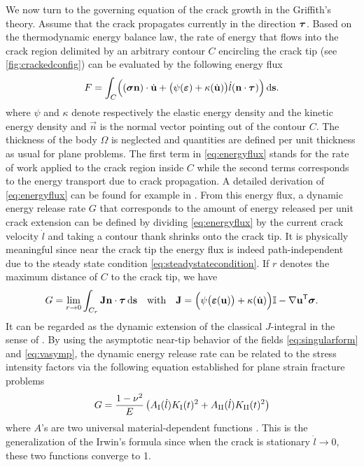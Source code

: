 We now turn to the governing equation of the crack growth in the Griffith's theory. Assume that the crack propagates currently in the direction $\vtau$. Based on the thermodynamic energy balance law, the rate of energy that flows into the crack region delimited by an arbitrary contour $C$ encircling the crack tip (see \cref{fig:crackedconfig}) can be evaluated by the following energy flux
\begin{equation} \label{eq:energyflux}
F=\int_C\Bigl((\sig\vec{n})\cdot\dot{\vec{u}}+\bigl(\psi(\eps)+\kappa(\dot{\vec{u}})\bigr)\dot{l}(\vec{n}\cdot\vtau)\Bigr)\ds.
\end{equation}
where $\psi$ and $\kappa$ denote respectively the elastic energy density and the kinetic energy density and $\vec{n}$ is the normal vector pointing out of the contour $C$. The thickness of the body $\Omega$ is neglected and quantities are defined per unit thickness as usual for plane problems. The first term in \eqref{eq:energyflux} stands for the rate of work applied to the crack region inside $C$ while the second terms corresponds to the energy transport due to crack propagation. A detailed derivation of \eqref{eq:energyflux} can be found for example in \cite{Freund:1972,NakamuraShihFreund:1985}. From this energy flux, a dynamic energy release rate $G$ that corresponds to the amount of energy released per unit crack extension can be defined by dividing \eqref{eq:energyflux} by the current crack velocity $\dot{l}$ and taking a contour thank shrinks onto the crack tip. It is physically meaningful since near the crack tip the energy flux is indeed path-independent due to the steady state condition \eqref{eq:steadystatecondition}. If $r$ denotes the maximum distance of $C$ to the crack tip, we have
\begin{equation} \label{eq:Jdyn}
G=\lim_{r\to 0}\int_{C_r}\vec{J}\vec{n}\cdot\vtau\ds\quad\text{with}\quad\vec{J}=\Bigl(\psi\bigl(\eps(\vec{u})\bigr)+\kappa(\dot{\vec{u}})\Bigr)\mathbb{I}-\nabla\vec{u}^\mT\sig.
\end{equation}
It can be regarded as the dynamic extension of the classical $J$-integral in the sense of \cite{Cherepanov:1967aa,Rice:1968aa}. By using the asymptotic near-tip behavior of the fields \eqref{eq:singularform} and \eqref{eq:vasymp}, the dynamic energy release rate can be related to the stress intensity factors via the following equation established for plane strain fracture problems
\begin{equation} \label{eq:GasafunctionofK}
G=\frac{1-\nu^2}{E}\left(A_\RN{1}(\dot{l})K_\RN{1}(t)^2+A_\RN{2}(\dot{l})K_\RN{2}(t)^2\right)
\end{equation}
where $A$'s are two universal material-dependent functions \cite[p.~234]{Freund:1990}. This is the generalization of the Irwin's formula \cite{Irwin:1957aa} since when the crack is stationary $\dot{l}\to 0$, these two functions converge to 1.

